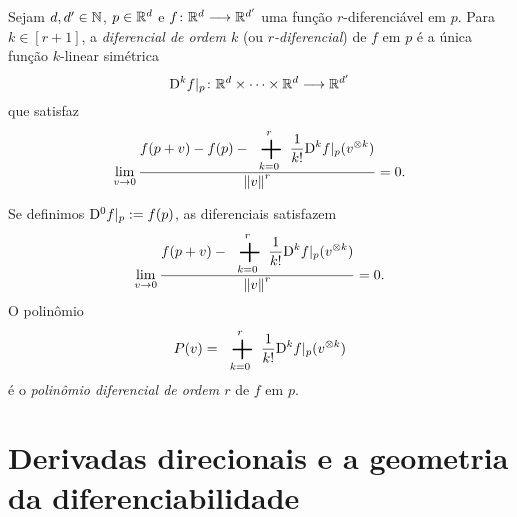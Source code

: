 \begin{definition}[$r$-Diferencial]
Sejam $d,d' \in \mathbb{N}$, $p \in \mathbb{R}^d$ e ${f}\colon {\mathbb{R}^d} \longrightarrow {\mathbb{R}^{d'}}$ uma função $r$-diferenciável em $p$. Para $k \in [r+1]$, a \emph{diferencial de ordem $k$} (ou \emph{$r$-diferencial}) de $f$ em $p$ é a única função $k$-linear simétrica
	\begin{equation*}
	{\mathrm{D}^k f|_p}\colon {\mathbb{R}^d \times \cdots \times \mathbb{R}^d} \longrightarrow {\mathbb{R}^{d'}}
	\end{equation*}
que satisfaz
	\begin{equation*}
	\lim_{v \conv 0} \frac{\displaystyle f(p+v) - f(p) - \sum_{k=0}^r \frac{1}{k!}\D^k f|_p(v^{\otimes k})}{\nor{v}^r} = 0.
	\end{equation*}

Se definimos $\mathrm{D}^0 f|_p := f(p)$, as diferenciais satisfazem
	\begin{equation*}
	\lim_{v \conv 0} \frac{\displaystyle f(p+v) - \sum_{k=0}^r \frac{1}{k!}\D^k f|_p (v^{\otimes k})}{\nor{v}^r} = 0.
	\end{equation*}
O polinômio
	\begin{equation*}
	P(v) = \sum_{k=0}^r \frac{1}{k!}\D^k f|_p (v^{\otimes k})
	\end{equation*}
é o \emph{polinômio diferencial de ordem $r$} de $f$ em $p$.
\end{definition}


\begin{comment}

\begin{exercise}[Regra da cadeia iterada]
Sejam $d,d',d'' \in \N$, $p \in \R^d$, $\fun{f}{\R^d}{\R^{d'}}$ $2$-diferenciável em $p$ e $\fun{f'}{\R^{d'}}{\R^{d''}}$ diferenciável em $f(p)$. Então $\fun{f' \circ f}{\R^d}{\R^{d''}}$ é diferenciável em $p$ e
	\begin{equation*}
	\D^2 (f' \circ f)(p,p) = \D^2 f'(f(p),f(p)) \circ \D f(p) + \D f'(f(p)) \circ \D^2 f(p)
	\end{equation*}
	\begin{equation*}
	\D^2 \left. (f' \circ f)\right|_{(p,p)} = \D^2 f'|_{(f(p),f(p))} \circ \D f|_p + \D f'|_{f(p)} \circ \D^2 f|_p.
	\end{equation*}
\end{exercise}

\end{comment}



\section{Derivadas direcionais e a geometria da diferenciabilidade}

